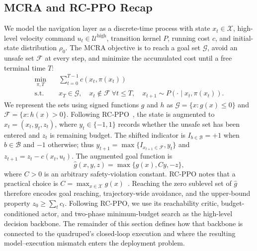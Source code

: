 \documentclass{article}
\begin{document}
\subsection{MCRA and RC-PPO Recap}
We model the navigation layer as a discrete-time process with state $x_t\in
\mathcal{X}$, high-level velocity command $u_t\in\mathcal{U}^{\mathrm{high}}$,
transition kernel $P$, running cost $c$, and initial-state distribution $\rho_0$.
The MCRA objective is to reach a goal set $\mathcal{G}$, avoid an unsafe set
$\mathcal{F}$ at every step, and minimize the accumulated cost until a free terminal
time $T$:
\begin{align}
\min_{\pi,T}\quad &\sum_{t=0}^{T-1}c(x_t,\pi(x_t))\\
\mathrm{s.t.}\quad &x_T\in\mathcal{G},\quad x_t\notin\mathcal{F}\ \forall t\leq T,
\quad x_{t+1}\sim P(\cdot\mid x_t,\pi(x_t)).
\end{align}
We represent the sets using signed functions $g$ and $h$ as
$\mathcal{G}=\{x:g(x)\leq0\}$ and $\mathcal{F}=\{x:h(x)>0\}$. Following
RC-PPO~\citep{so2024}, the state is augmented to $\hat{x}_t=(x_t,y_t,z_t)$,
where $y_t\in\{-1,1\}$ records whether the unsafe set has been entered and $z_t$
is remaining budget. The shifted indicator is
$I_{b\in\mathcal{B}}=+1$ when $b\in\mathcal{B}$ and $-1$ otherwise; thus
$y_{t+1}=\max\{I_{x_{t+1}\in\mathcal{F}},y_t\}$ and
$z_{t+1}=z_t-c(x_t,u_t)$. The augmented goal function is
\begin{equation}
\hat{g}(x,y,z)=\max\{g(x),Cy,-z\},
\end{equation}
where $C>0$ is an arbitrary safety-violation constant. RC-PPO notes that a
practical choice is $C=\max_{x\in\mathcal{X}}g(x)$~\citep{so2024}. Reaching the
zero sublevel set of $\hat{g}$ therefore encodes goal reaching, trajectory-wide
avoidance, and the upper-bound property $z_0\geq\sum_t c_t$. Following RC-PPO, we
use its reachability critic, budget-conditioned actor, and two-phase minimum-budget
search as the high-level decision backbone. The remainder of this section defines
how that backbone is connected to the quadruped's closed-loop execution and where
the resulting model--execution mismatch enters the deployment problem.
\end{document}
